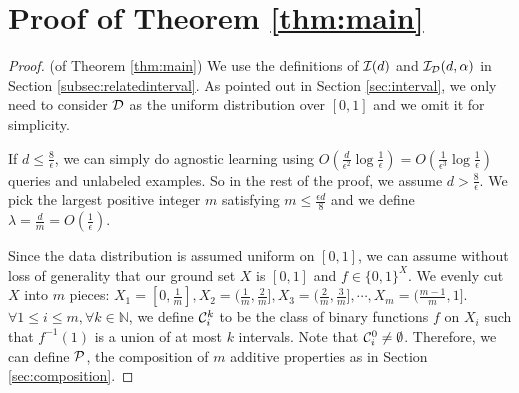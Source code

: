 \section{Proof of Theorem \ref{thm:main}}
\label{sec:proofmain}
\begin{proof}(of Theorem \ref{thm:main})
We use the definitions of ${\mathcal{I}}(d)$ and ${\mathcal{I}}_{\mathcal{D}}(d,\alpha)$ in Section \ref{subsec:relatedinterval}. As pointed out in Section \ref{sec:interval}, we only need to consider ${\mathcal{D}}$ as the uniform distribution over $[0,1]$ and we omit it for simplicity.  %





If $d\leq\frac{8}{\epsilon}$, we can simply do agnostic learning using $O(\frac{d}{\epsilon^2}\log\frac{1}{\epsilon})=O(\frac{1}{\epsilon^3}\log\frac{1}{\epsilon})$ queries and unlabeled examples. So in the rest of the proof, we assume $d>\frac{8}{\epsilon}$. We pick the largest positive integer $m$ satisfying $m\leq\frac{\epsilon d}{8}$ and we define $\lambda=\frac{d}{m}=O(\frac{1}{\epsilon})$.

Since the data distribution is assumed uniform on $[0,1]$, we can assume without loss of generality that our ground set $X$ is $[0,1]$ and $f\in\{0,1\}^X$. We evenly cut $X$ into $m$ pieces: $X_1=[0,\frac{1}{m}],X_2=(\frac{1}{m},\frac{2}{m}],X_3=(\frac{2}{m},\frac{3}{m}],\cdots,X_m=(\frac{m-1}{m},1]$. $\forall 1\leq i\leq m,\forall k\in\mathbb{N}$, we define ${\mathcal{C}}_i^k$ to be the class of binary functions $f$ on $X_i$ such that $f^{-1}(1)$ is a union of at most $k$ intervals. Note that ${\mathcal{C}}_i^0\neq\emptyset$. Therefore, we can define ${\mathcal{P}}$, the composition of $m$ additive properties as in Section \ref{sec:composition}. 


\end{proof}
